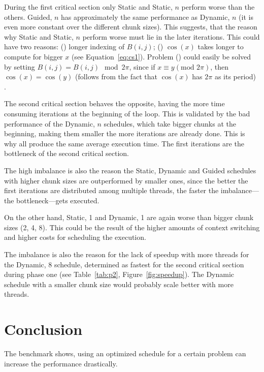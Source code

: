 \documentclass[twoside,11pt]{article}
\begin{document}
During the first critical section only Static and Static,
$n$ perform worse than the others.
Guided, $n$ has approximately the same performance
as Dynamic, $n$ (it is even more constant over the
different chunk sizes).
This suggests, that the reason why Static and
Static, $n$ perform worse must lie in the later iterations.
This could have two reasons: () longer
indexing of $B(i, j)$; () $\cos(x)$ takes
longer to compute for bigger $x$
(see Equation~\ref{eq:cs1}).
Problem () could easily be solved by
setting $B(i, j) = B(i, j) \mod 2\pi$, since if
$x \equiv y (\text{mod }2\pi)$, then $\cos(x) = \cos(y)$
(follows from the fact that $\cos(x)$ has $2\pi$ as its
period) \citep[see e.g.][]{trig}.

The second critical section behaves the opposite, having
the more time consuming iterations at the beginning of
the loop.
This is validated by the bad performance of the Dynamic,
$n$ schedules, which take bigger chunks at the beginning,
making them smaller the more iterations are already done.
This is why all produce the same average execution time.
The first iterations are the bottleneck of the second
critical section.

The high imbalance is also the reason the Static, Dynamic
and Guided schedules with higher chunk sizes are
outperformed by smaller ones, since the better the first
iterations are distributed among multiple threads, the
faster the imbalance---the bottleneck---gets executed.

On the other hand, Static, 1 and Dynamic, 1 are again
worse than bigger chunk sizes (2, 4, 8).
This could be the result of the higher amounts of context
switching and higher costs for scheduling the execution.

The imbalance is also the reason for the lack of speedup
with more threads for the Dynamic, 8 schedule, determined
as fastest for the second critical section during phase one
(see Table~\ref{tab:p2}, Figure~\ref{fig:speedup}).
The Dynamic schedule with a smaller chunk size would
probably scale better with more threads.


\section{Conclusion} %

The benchmark shows, using an optimized schedule for
a certain problem can increase the performance drastically.
\end{document}
